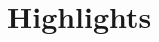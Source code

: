 \documentclass[]{deedy-resume-openfont}
\begin{document}
\begin{minipage}[t]{0.33\textwidth}




\section{Highlights}


\end{minipage}
\end{document}
